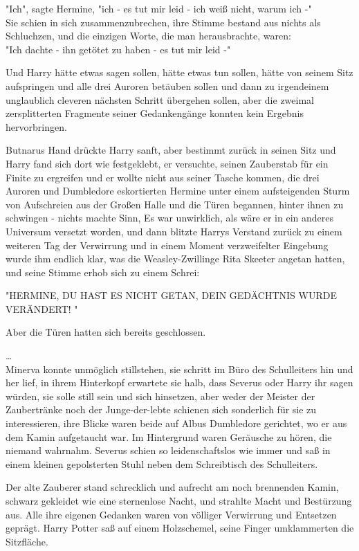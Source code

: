{"Ich", sagte Hermine, "ich - es tut mir leid - ich weiß nicht, warum ich -"\\ Sie schien in sich zusammenzubrechen, ihre Stimme bestand aus nichts als Schluchzen, und die einzigen Worte, die man herausbrachte, waren:\\ "Ich dachte - ihn getötet zu haben - es tut mir leid -"

Und Harry hätte etwas sagen sollen, hätte etwas tun sollen, hätte von seinem Sitz aufspringen und alle drei Auroren betäuben sollen und dann zu irgendeinem unglaublich cleveren nächsten Schritt übergehen sollen, aber die zweimal zersplitterten Fragmente seiner Gedankengänge konnten kein Ergebnis hervorbringen.

Butnarus Hand drückte Harry sanft, aber bestimmt zurück in seinen Sitz und Harry fand sich dort wie festgeklebt, er versuchte, seinen Zauberstab für ein Finite zu ergreifen und er wollte nicht aus seiner Tasche kommen, die drei Auroren und Dumbledore eskortierten Hermine unter einem aufsteigenden Sturm von Aufschreien aus der Großen Halle und die Türen begannen, hinter ihnen zu schwingen - nichts machte Sinn, Es war unwirklich, als wäre er in ein anderes Universum versetzt worden, und dann blitzte Harrys Verstand zurück zu einem weiteren Tag der Verwirrung und in einem Moment verzweifelter Eingebung wurde ihm endlich klar, was die Weasley-Zwillinge Rita Skeeter angetan hatten, und seine Stimme erhob sich zu einem Schrei:

"HERMINE, DU HAST ES NICHT GETAN, DEIN GEDÄCHTNIS WURDE VERÄNDERT! "

Aber die Türen hatten sich bereits geschlossen.

…\\ Minerva konnte unmöglich stillstehen, sie schritt im Büro des Schulleiters hin und her lief, in ihrem Hinterkopf erwartete sie halb, dass Severus oder Harry ihr sagen würden, sie solle still sein und sich hinsetzen, aber weder der Meister der Zaubertränke noch der Junge-der-lebte schienen sich sonderlich für sie zu interessieren, ihre Blicke waren beide auf Albus Dumbledore gerichtet, wo er aus dem Kamin aufgetaucht war. Im Hintergrund waren Geräusche zu hören, die niemand wahrnahm. Severus schien so leidenschaftslos wie immer und saß in einem kleinen gepolsterten Stuhl neben dem Schreibtisch des Schulleiters.

Der alte Zauberer stand schrecklich und aufrecht am noch brennenden Kamin, schwarz gekleidet wie eine sternenlose Nacht, und strahlte Macht und Bestürzung aus. Alle ihre eigenen Gedanken waren von völliger Verwirrung und Entsetzen geprägt. Harry Potter saß auf einem Holzschemel, seine Finger umklammerten die Sitzfläche.

}
